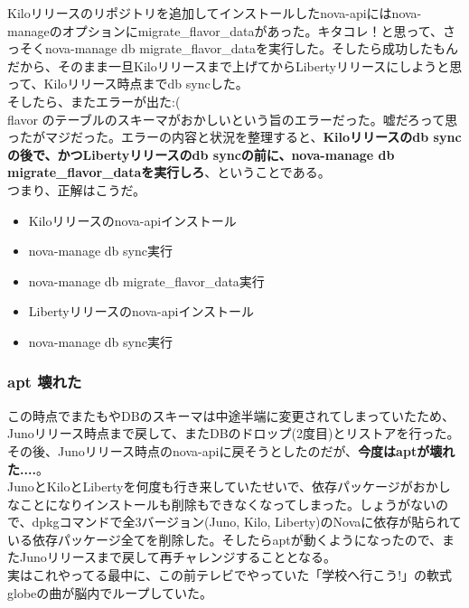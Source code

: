 \documentclass[9pt,b5paper,tombo,openany]{jsbook}
\begin{document}
Kiloリリースのリポジトリを追加してインストールしたnova-apiにはnova-manageのオプションにmigrate\_flavor\_dataがあった。キタコレ！と思って、さっそくnova-manage db migrate\_flavor\_dataを実行した。そしたら成功したもんだから、そのまま一旦Kiloリリースまで上げてからLibertyリリースにしようと思って、Kiloリリース時点までdb syncした。\\[1ex]

\noindent
そしたら、またエラーが出た:(\\[1ex]

flavor のテーブルのスキーマがおかしいという旨のエラーだった。嘘だろって思ったがマジだった。エラーの内容と状況を整理すると、\textbf{Kiloリリースのdb syncの後で、かつLibertyリリースのdb syncの前に、nova-manage db migrate\_flavor\_dataを実行しろ}、ということである。\\[1ex]

\noindent
つまり、正解はこうだ。

\begin{itemize}
	\item Kiloリリースのnova-apiインストール
	\item nova-manage db sync実行
	\item nova-manage db migrate\_flavor\_data実行
	\item Libertyリリースのnova-apiインストール
	\item nova-manage db sync実行
\end{itemize}


\subsubsection{apt 壊れた}
この時点でまたもやDBのスキーマは中途半端に変更されてしまっていたため、Junoリリース時点まで戻して、またDBのドロップ(2度目)とリストアを行った。その後、Junoリリース時点のnova-apiに戻そうとしたのだが、\textbf{今度はaptが壊れた....}。\\[1ex]

JunoとKiloとLibertyを何度も行き来していたせいで、依存パッケージがおかしなことになりインストールも削除もできなくなってしまった。しょうがないので、dpkgコマンドで全3バージョン(Juno, Kilo, Liberty)のNovaに依存が貼られている依存パッケージ全てを削除した。そしたらaptが動くようになったので、またJunoリリースまで戻して再チャレンジすることとなる。\\[1ex]

実はこれやってる最中に、この前テレビでやっていた「学校へ行こう!」の軟式globeの曲が脳内でループしていた。\\[1ex]
\end{document}
